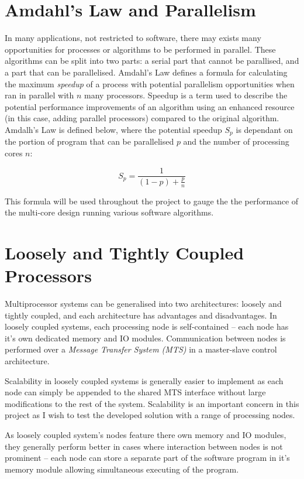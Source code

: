 \section{Amdahl's Law and Parallelism}
In many applications, not restricted to software, there may exists many opportunities for processes or algorithms to be performed in parallel. These algorithms can be split into two parts: a serial part that cannot be parallised, and a part that can be parallelised. Amdahl's Law defines a formula for calculating the maximum \textit{speedup} of a process with potential parallelism opportunities when ran in parallel with $n$ many processors. Speedup is a term used to describe the potential performance improvements of an algorithm using an enhanced resource (in this case, adding parallel processors) compared to the original algorithm. Amdalh's Law is defined below, where the potential speedup $S_p$ is dependant on the portion of program that can be parallelised $p$ and the number of processing cores $n$:

\begin{equation}
S_{p} = \frac{1}{(1-p)+\frac{p}{n}}
\label{eq:amdahl}
\end{equation}

This formula will be used throughout the project to gauge the the performance of the multi-core design running various software algorithms.

\section{Loosely and Tightly Coupled Processors}
Multiprocessor systems can be generalised into two architectures: loosely and tightly coupled, and each architecture has advantages and disadvantages. 
In loosely coupled systems, each processing node is self-contained -- each node has it's own dedicated memory and IO modules. Communication between nodes is performed over a \textit{Message Transfer System (MTS)} \cite{preeti_aritra_2017}  in a master-slave control architecture.

Scalability in loosely coupled systems is generally easier to implement as each node can simply be appended to the shared MTS interface without large modifications to the rest of the system. Scalability is an important concern in this project as I wish to test the developed solution with a range of processing nodes.

As loosely coupled system's nodes feature there own memory and IO modules, they generally perform better in cases where interaction between nodes is not prominent -- each node can store a separate part of the software program in it's memory module allowing simultaneous executing of the program.

